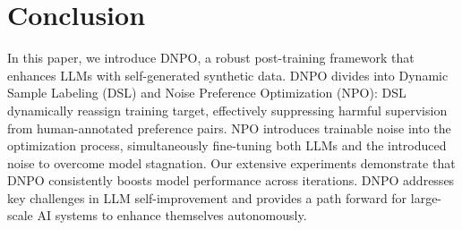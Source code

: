 \section{Conclusion}
In this paper, we introduce DNPO, a robust post-training framework that enhances LLMs with self-generated synthetic data. DNPO divides into Dynamic Sample Labeling (DSL) and Noise Preference Optimization (NPO): DSL dynamically reassign training target, effectively suppressing harmful supervision from human-annotated preference pairs. NPO introduces trainable noise into the optimization process, simultaneously fine-tuning both LLMs and the introduced noise to overcome model stagnation. Our extensive experiments demonstrate that DNPO consistently boosts model performance across iterations. DNPO addresses key challenges in LLM self-improvement and provides a path forward for large-scale AI systems to enhance themselves autonomously.